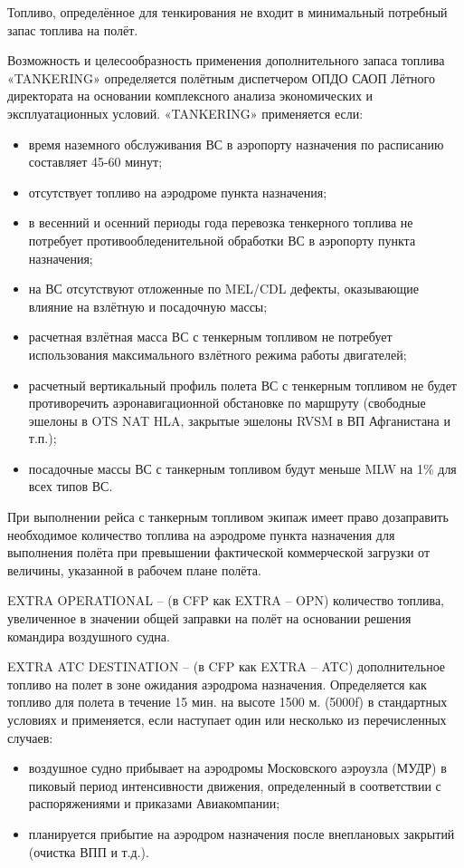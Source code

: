 Топливо, определённое для тенкирования не входит в минимальный потребный запас топлива на полёт. 

Возможность и целесообразность применения дополнительного запаса топлива «TANKERING» определяется полётным диспетчером ОПДО САОП Лётного директората на основании комплексного анализа экономических и эксплуатационных условий. «TANKERING» применяется если: 
\begin{itemize}
    \item время наземного обслуживания ВС в аэропорту назначения по расписанию составляет 45-60 минут;
    \item отсутствует топливо на аэродроме пункта назначения; 
    \item в весенний и осенний периоды года перевозка тенкерного топлива не потребует противообледенительной обработки ВС в аэропорту пункта назначения;
    \item на ВС отсутствуют отложенные по MEL/CDL дефекты, оказывающие влияние на взлётную и посадочную массы; 
    \item расчетная взлётная масса ВС с тенкерным топливом не потребует использования максимального взлётного режима работы двигателей;
    \item расчетный вертикальный профиль полета ВС с тенкерным топливом не будет противоречить аэронавигационной обстановке по маршруту (свободные эшелоны в OTS NAT HLA, закрытые эшелоны RVSM в ВП Афганистана и т.п.);
    \item посадочные массы ВС с танкерным топливом будут меньше MLW на 1\% для всех типов ВС.
\end{itemize}

При выполнении рейса с танкерным топливом экипаж имеет право дозаправить необходимое количество топлива на аэродроме пункта назначения для выполнения полёта при превышении фактической коммерческой загрузки от величины, указанной в рабочем плане полёта.

EXTRA OPERATIONAL – (в CFP как EXTRA – OPN) количество топлива, увеличенное в значении общей заправки на полёт на основании решения командира воздушного судна.

EXTRA ATC DESTINATION – (в CFP как EXTRA – ATC) дополнительное топливо на полет в зоне ожидания аэродрома назначения. Определяется как топливо для полета в течение 15 мин. на высоте 1500 м. (5000f) в стандартных условиях и применяется, если наступает один или несколько из перечисленных случаев: 
\begin{itemize}
    \item воздушное судно прибывает на аэродромы Московского аэроузла (МУДР) в пиковый период интенсивности движения, определенный в соответствии с распоряжениями и приказами Авиакомпании;
    \item планируется прибытие на аэродром назначения после внеплановых закрытий (очистка ВПП и т.д.).
\end{itemize}
	
